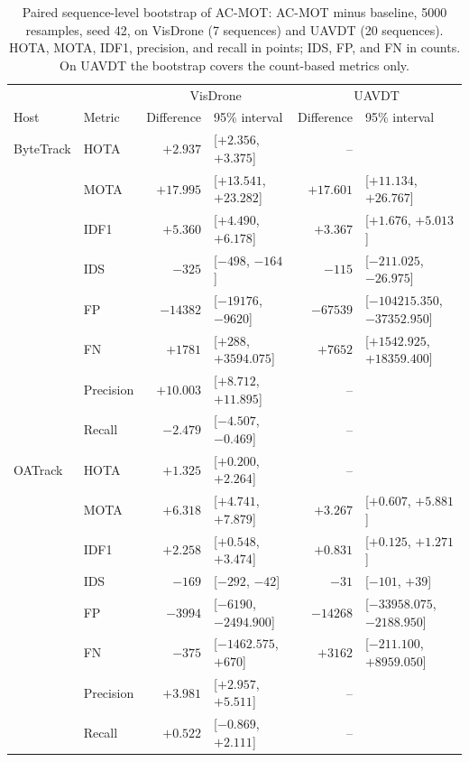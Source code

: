 \begin{table}[tbp]
\centering
\caption{Paired sequence-level bootstrap of AC-MOT: AC-MOT minus baseline, 5000 resamples, seed 42, on VisDrone (7 sequences) and UAVDT (20 sequences). HOTA, MOTA, IDF1, precision, and recall in points; IDS, FP, and FN in counts. On UAVDT the bootstrap covers the count-based metrics only.}
\label{tab:res-ac-bootstrap}
\begin{tabular}{llrlrl}
\toprule
 & & \multicolumn{2}{c}{VisDrone} & \multicolumn{2}{c}{UAVDT}\\
Host & Metric & Difference & 95\% interval & Difference & 95\% interval\\
\midrule
ByteTrack & HOTA & $+2.937$ & [$+2.356$, $+3.375$] & -- & \\
 & MOTA & $+17.995$ & [$+13.541$, $+23.282$] & $+17.601$ & [$+11.134$, $+26.767$]\\
 & IDF1 & $+5.360$ & [$+4.490$, $+6.178$] & $+3.367$ & [$+1.676$, $+5.013$]\\
 & IDS & $-325$ & [$-498$, $-164$] & $-115$ & [$-211.025$, $-26.975$]\\
 & FP & $-14382$ & [$-19176$, $-9620$] & $-67539$ & [$-104215.350$, $-37352.950$]\\
 & FN & $+1781$ & [$+288$, $+3594.075$] & $+7652$ & [$+1542.925$, $+18359.400$]\\
 & Precision & $+10.003$ & [$+8.712$, $+11.895$] & -- & \\
 & Recall & $-2.479$ & [$-4.507$, $-0.469$] & -- & \\
\midrule
OATrack & HOTA & $+1.325$ & [$+0.200$, $+2.264$] & -- & \\
 & MOTA & $+6.318$ & [$+4.741$, $+7.879$] & $+3.267$ & [$+0.607$, $+5.881$]\\
 & IDF1 & $+2.258$ & [$+0.548$, $+3.474$] & $+0.831$ & [$+0.125$, $+1.271$]\\
 & IDS & $-169$ & [$-292$, $-42$] & $-31$ & [$-101$, $+39$]\\
 & FP & $-3994$ & [$-6190$, $-2494.900$] & $-14268$ & [$-33958.075$, $-2188.950$]\\
 & FN & $-375$ & [$-1462.575$, $+670$] & $+3162$ & [$-211.100$, $+8959.050$]\\
 & Precision & $+3.981$ & [$+2.957$, $+5.511$] & -- & \\
 & Recall & $+0.522$ & [$-0.869$, $+2.111$] & -- & \\
\bottomrule
\end{tabular}
\end{table}

